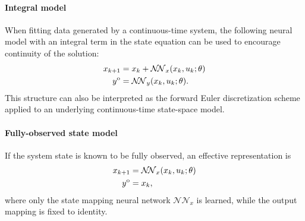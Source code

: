 \documentclass{article}
\newcommand{\NN}{\mathcal{N\!N}} %
\newcommand{\ymodel}{y^{\rm o}}
\begin{document}
\paragraph{Integral model}
When fitting data generated by a continuous-time system, the following neural model  with an integral term in the state equation can be used to encourage continuity of the solution:
\begin{subequations}
	\label{eq:neural_ss_full_Int}
	\begin{align}
	x_{k+1} &= x_k + \NN_x(x_{k}, u_{k}; \theta) \label{eq:neural_ss_state_int} \\ 
	\ymodel     &= \NN_y(x_{k}, u_{k}; \theta).
	\end{align}
\end{subequations}
 This structure can also be interpreted as the forward Euler discretization scheme applied to an underlying continuous-time  state-space model.

\paragraph{Fully-observed state model}
If the system state is known to be fully observed, an effective representation is
\begin{subequations}
\label{eq:neural_ss_full}
\begin{align}
 x_{k+1} &= \NN_x(x_{k}, u_{k}; \theta) \label{eq:neural_ss_state} \\ 
 \ymodel     &= x_k,
\end{align}
\end{subequations}
where only the state mapping neural network $\NN_x$ is learned, while the output mapping is fixed to identity. 
\end{document}
